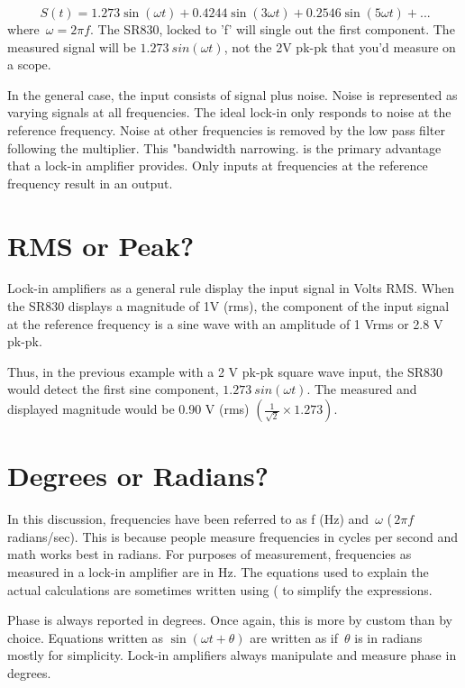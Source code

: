 \documentclass{../lab}
\begin{document}
\begin{equation}
    \!\, S(t) = 1.273 \sin \left ( \omega t \right ) + 0.4244 \sin \left ( 3 \omega t \right ) + 0.2546 \sin \left (5 \omega t \right) + ...
\end{equation}
where $ \!\, \omega = 2 \pi f $. The SR830, locked to 'f' will single out the first component. The measured signal will be $ 1.273 \ sin \left ( \omega t \right ) $, not the 2V pk-pk that you'd measure on a scope.

In the general case, the input consists of signal plus noise. Noise is represented as varying signals at all frequencies. The ideal lock-in only responds to noise at the reference frequency. Noise at other frequencies is removed by the low pass filter following the multiplier. This "bandwidth narrowing. is the primary advantage that a lock-in amplifier provides. Only inputs at frequencies at the reference frequency result in an output.

\section{RMS or Peak?}

Lock-in amplifiers as a general rule display the input signal in Volts RMS. When the SR830 displays a magnitude of 1V (rms), the component of the input signal at the reference frequency is a sine wave with an amplitude of 1 Vrms or 2.8 V pk-pk.

Thus, in the previous example with a 2 V pk-pk square wave input, the SR830 would detect the first sine component, $ 1.273 \ sin \left ( \omega t \right ) $. The measured and displayed magnitude would be 0.90 V (rms) $ \left ( \frac {1} { \sqrt{2}} \times 1.273 \right ) $.

\section{Degrees or Radians?}

In this discussion, frequencies have been referred to as f (Hz) and $ \!\,\omega $ ($ \!\,2 \pi f $ radians/sec). This is because people measure frequencies in cycles per second and math works best in radians. For purposes of measurement, frequencies as measured in a lock-in amplifier are in Hz. The equations used to explain the actual calculations are sometimes written using ( to simplify the expressions.

Phase is always reported in degrees. Once again, this is more by custom than by choice. Equations written as $ \sin \left ( \omega t+ \theta \right ) $ are written as if $ \!\,\theta $ is in radians mostly for simplicity. Lock-in amplifiers always manipulate and measure phase in degrees.
\end{document}
